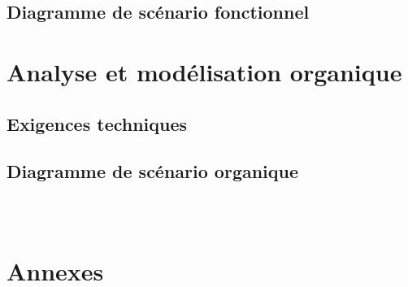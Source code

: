 \documentclass{article}
\begin{document}
\clearpage


\subsection{Diagramme de scénario fonctionnel}

\clearpage


\subsection{}

\clearpage


\section{Analyse et modélisation organique}



\subsection{Exigences techniques}

\clearpage


\subsection{Diagramme de scénario organique}

\clearpage


\subsection{}

\clearpage


\

\section{Annexes}
\end{document}
